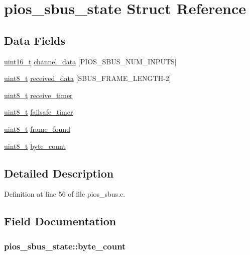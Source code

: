 \hypertarget{structpios__sbus__state}{\section{pios\-\_\-sbus\-\_\-state Struct Reference}
\label{structpios__sbus__state}
}
\subsection*{Data Fields}
\begin{DoxyCompactItemize}
\item 
\hyperlink{stdint_8h_a273cf69d639a59973b6019625df33e30}{uint16\-\_\-t} \hyperlink{structpios__sbus__state_ac6e4db09887aa141183e800d990ad794}{channel\-\_\-data} \mbox{[}P\-I\-O\-S\-\_\-\-S\-B\-U\-S\-\_\-\-N\-U\-M\-\_\-\-I\-N\-P\-U\-T\-S\mbox{]}
\item 
\hyperlink{stdint_8h_aba7bc1797add20fe3efdf37ced1182c5}{uint8\-\_\-t} \hyperlink{structpios__sbus__state_a83bb02cd783bb2f8d8aabf3b94e9324b}{received\-\_\-data} \mbox{[}S\-B\-U\-S\-\_\-\-F\-R\-A\-M\-E\-\_\-\-L\-E\-N\-G\-T\-H-\/2\mbox{]}
\item 
\hyperlink{stdint_8h_aba7bc1797add20fe3efdf37ced1182c5}{uint8\-\_\-t} \hyperlink{structpios__sbus__state_a064c8174115b5d3e710a97e8a0df781f}{receive\-\_\-timer}
\item 
\hyperlink{stdint_8h_aba7bc1797add20fe3efdf37ced1182c5}{uint8\-\_\-t} \hyperlink{structpios__sbus__state_a5238707dcd8e68afb924becd99a5ea83}{failsafe\-\_\-timer}
\item 
\hyperlink{stdint_8h_aba7bc1797add20fe3efdf37ced1182c5}{uint8\-\_\-t} \hyperlink{structpios__sbus__state_a44f2ee1a5d510745a695cd8a38324559}{frame\-\_\-found}
\item 
\hyperlink{stdint_8h_aba7bc1797add20fe3efdf37ced1182c5}{uint8\-\_\-t} \hyperlink{structpios__sbus__state_aa6babeae323fa32b273fff516cdc4c1d}{byte\-\_\-count}
\end{DoxyCompactItemize}


\subsection{Detailed Description}


Definition at line 56 of file pios\-\_\-sbus.\-c.



\subsection{Field Documentation}
\hypertarget{structpios__sbus__state_aa6babeae323fa32b273fff516cdc4c1d}{
\subsubsection[{byte\-\_\-count}]{ pios\-\_\-sbus\-\_\-state\-::byte\-\_\-count}}\label{structpios__sbus__state_aa6babeae323fa32b273fff516cdc4c1d}


